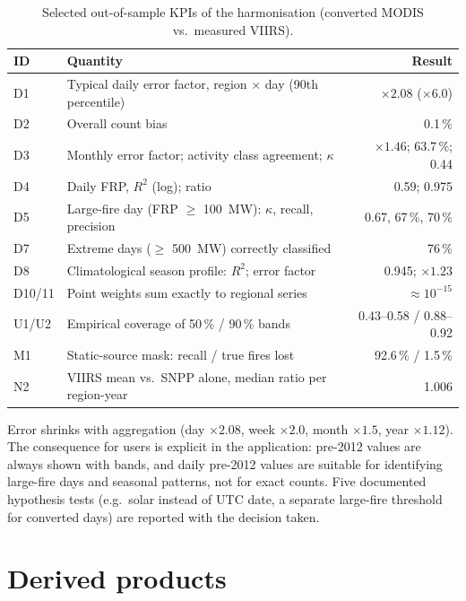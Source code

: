 \documentclass[11pt,a4paper]{article}
\begin{document}
\begin{table}[ht]
\centering\small
\caption{Selected out-of-sample KPIs of the harmonisation (converted MODIS vs.\ measured VIIRS).}
\label{tab:kpi}
\begin{tabularx}{\linewidth}{@{}lLr@{}}
\toprule
ID & Quantity & Result \\
\midrule
D1 & Typical daily error factor, region $\times$ day (90th percentile) & $\times 2.08$ ($\times 6.0$) \\
D2 & Overall count bias & 0.1\,\% \\
D3 & Monthly error factor; activity class agreement; $\kappa$ & $\times 1.46$; 63.7\,\%; 0.44 \\
D4 & Daily FRP, $R^2$ (log); ratio & 0.59; 0.975 \\
D5 & Large-fire day (FRP $\geq$ \SI{100}{MW}): $\kappa$, recall, precision & 0.67, 67\,\%, 70\,\% \\
D7 & Extreme days ($\geq$ \SI{500}{MW}) correctly classified & 76\,\% \\
D8 & Climatological season profile: $R^2$; error factor & 0.945; $\times 1.23$ \\
D10/11 & Point weights sum exactly to regional series & $\approx 10^{-15}$ \\
U1/U2 & Empirical coverage of 50\,\% / 90\,\% bands & 0.43--0.58 / 0.88--0.92 \\
M1 & Static-source mask: recall / true fires lost & 92.6\,\% / 1.5\,\% \\
N2 & VIIRS mean vs.\ SNPP alone, median ratio per region-year & 1.006 \\
\bottomrule
\end{tabularx}
\end{table}

Error shrinks with aggregation (day $\times 2.08$, week $\times 2.0$, month $\times 1.5$, year
$\times 1.12$). The consequence for users is explicit in the application: pre-2012 values are always shown
with bands, and daily pre-2012 values are suitable for identifying large-fire days and seasonal patterns,
not for exact counts. Five documented hypothesis tests (e.g.\ solar instead of UTC date, a separate
large-fire threshold for converted days) are reported with the decision taken.

\section{Derived products}\label{sec:products}
\end{document}

